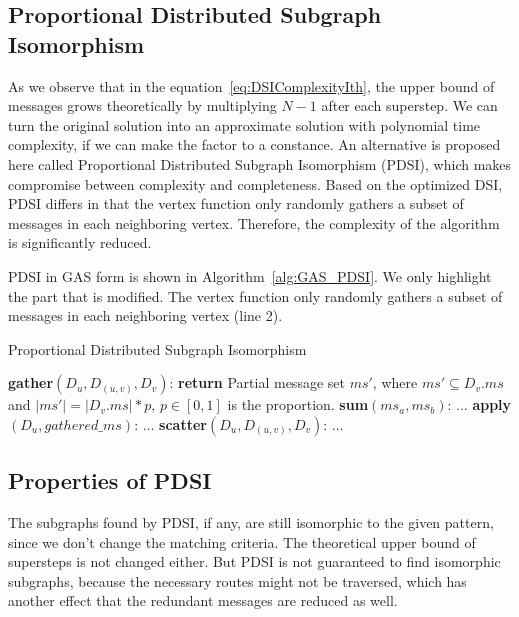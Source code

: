 \subsection{Proportional Distributed Subgraph Isomorphism}

As we observe that in the equation~\ref{eq:DSIComplexityIth}, the upper bound of messages grows theoretically by multiplying $N-1$ after each superstep. We can turn the original solution into an approximate solution with polynomial time complexity, if we can make the factor to a constance. An alternative is proposed here called Proportional Distributed Subgraph Isomorphism (PDSI), which makes compromise between complexity and completeness. Based on the optimized DSI, PDSI differs in that the vertex function only randomly gathers a subset of messages in each neighboring vertex. Therefore, the complexity of the algorithm is significantly reduced. 

PDSI in GAS form is shown in Algorithm~\vref{alg:GAS_PDSI}. We only highlight the part that is modified. The vertex function only randomly gathers a subset of messages in each neighboring vertex (line 2).

	\begin{Algorithmus}[H]
	\label{alg:GAS_PDSI}
	\caption{Proportional Distributed Subgraph Isomorphism}	
	\begin{algorithmic}[1]
	\State \textbf{gather}$(D_u, D_{(u,v)}, D_v)$: 
	\State \textbf{return} Partial message set $ms'$, where $ms' \subseteq D_v.ms$ and $|ms'| = |D_v.ms|*p$, $p \in [0,1]$ is the proportion.
	\newline
	\State \textbf{sum}$(ms_a, ms_b)$:
	\State ...
	\newline
	\State \textbf{apply}$(D_u, gathered\_ms)$:
	\State ...
	\newline
	\State \textbf{scatter}$(D_u, D_{(u,v)}, D_v)$:
	\State ...

	\end{algorithmic}	
	\end{Algorithmus}


\subsection{Properties of PDSI}

The subgraphs found by PDSI, if any, are still isomorphic to the given pattern, since we don't change the matching criteria. The theoretical upper bound of supersteps is not changed either. But PDSI is not guaranteed to find isomorphic subgraphs, because the necessary routes might not be traversed, which has another effect that the redundant messages are reduced as well.


